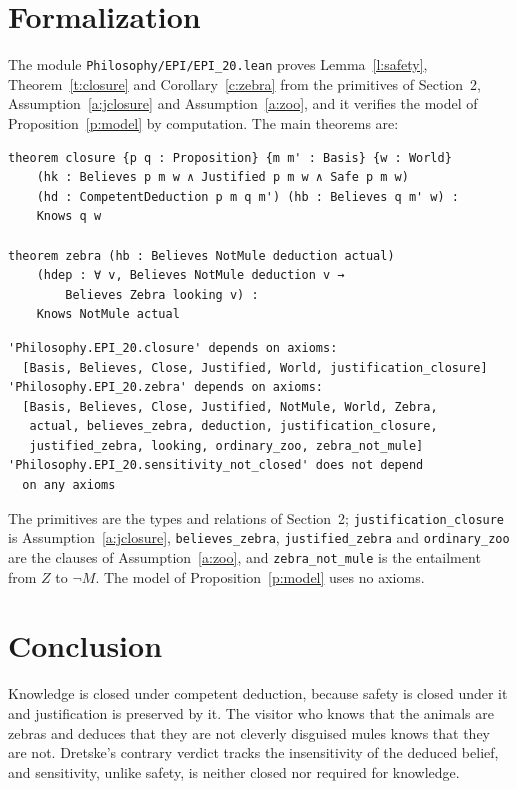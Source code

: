 \documentclass{situationist-preprint}
\begin{document}
\section{Formalization}

The module \nolinkurl{Philosophy/EPI/EPI_20.lean} proves Lemma~\ref{l:safety}, Theorem~\ref{t:closure} and Corollary~\ref{c:zebra} from the primitives of Section~2, Assumption~\ref{a:jclosure} and Assumption~\ref{a:zoo}, and it verifies the model of Proposition~\ref{p:model} by computation. The main theorems are:

\begin{lstlisting}
theorem closure {p q : Proposition} {m m' : Basis} {w : World}
    (hk : Believes p m w ∧ Justified p m w ∧ Safe p m w)
    (hd : CompetentDeduction p m q m') (hb : Believes q m' w) :
    Knows q w

theorem zebra (hb : Believes NotMule deduction actual)
    (hdep : ∀ v, Believes NotMule deduction v →
        Believes Zebra looking v) :
    Knows NotMule actual
\end{lstlisting}

\begin{lstlisting}
'Philosophy.EPI_20.closure' depends on axioms:
  [Basis, Believes, Close, Justified, World, justification_closure]
'Philosophy.EPI_20.zebra' depends on axioms:
  [Basis, Believes, Close, Justified, NotMule, World, Zebra,
   actual, believes_zebra, deduction, justification_closure,
   justified_zebra, looking, ordinary_zoo, zebra_not_mule]
'Philosophy.EPI_20.sensitivity_not_closed' does not depend
  on any axioms
\end{lstlisting}

The primitives are the types and relations of Section~2; \texttt{justification\_closure} is Assumption~\ref{a:jclosure}, \texttt{believes\_zebra}, \texttt{justified\_zebra} and \texttt{ordinary\_zoo} are the clauses of Assumption~\ref{a:zoo}, and \texttt{zebra\_not\_mule} is the entailment from $Z$ to $\neg M$. The model of Proposition~\ref{p:model} uses no axioms.

\section{Conclusion}

Knowledge is closed under competent deduction, because safety is closed under it and justification is preserved by it. The visitor who knows that the animals are zebras and deduces that they are not cleverly disguised mules knows that they are not. Dretske's contrary verdict tracks the insensitivity of the deduced belief, and sensitivity, unlike safety, is neither closed nor required for knowledge.
\end{document}
